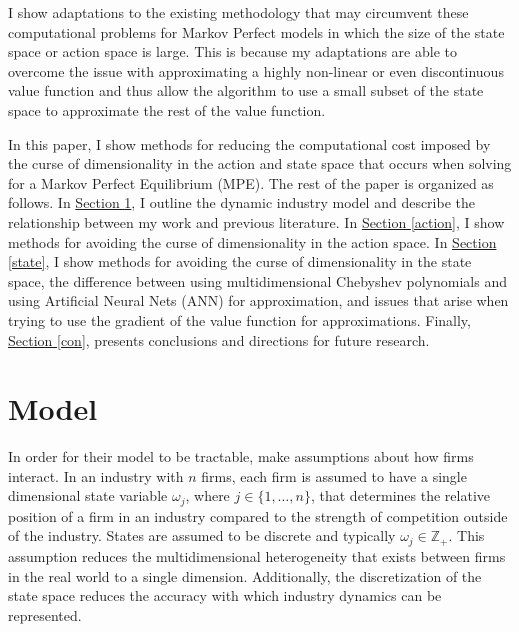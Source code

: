 \documentclass[12pt]{article}
\begin{document}
I show adaptations to the existing methodology that may circumvent these computational problems for Markov Perfect models in which the size of the state space or action space is large. This is because my adaptations are able to overcome the issue with approximating a highly non-linear or even discontinuous value function and thus allow the algorithm to use a small subset of the state space to approximate the rest of the value function.

In this paper, I show methods for reducing the computational cost imposed by the curse of dimensionality in the action and state space that occurs when solving for a Markov Perfect Equilibrium (MPE). The rest of the paper is organized as follows. In \hyperref[prelit]{Section \ref{prelit}}, I outline the dynamic industry model and describe the relationship between my work and previous literature. In  \hyperref[action]{Section \ref{action}}, I show methods for avoiding the curse of dimensionality in the action space. In \hyperref[state]{Section \ref{state}}, I show methods for avoiding the curse of dimensionality in the state space, the difference between using multidimensional Chebyshev polynomials and using Artificial Neural Nets (ANN) for approximation, and issues that arise when trying to use the gradient of the value function for approximations. Finally, \hyperref[con]{Section \ref{con}}, presents conclusions and directions for future research.

\section{Model}
\label{prelit}


In order for their model to be tractable, \citet{1995_Erickson_Pakes_RES} make assumptions about how firms interact. In an industry with $n$ firms, each firm is assumed to have a single dimensional state variable $\omega_j$, where $j \in \{1, \dots, n\}$, that determines the relative position of a firm in an industry compared to the strength of competition outside of the industry. States are assumed to be discrete and typically $\omega_j \in \mathbb{Z_+}$. This assumption reduces the multidimensional heterogeneity that exists between firms in the real world to a single dimension. Additionally, the discretization of the state space reduces the accuracy with which industry dynamics can be represented.
\end{document}
